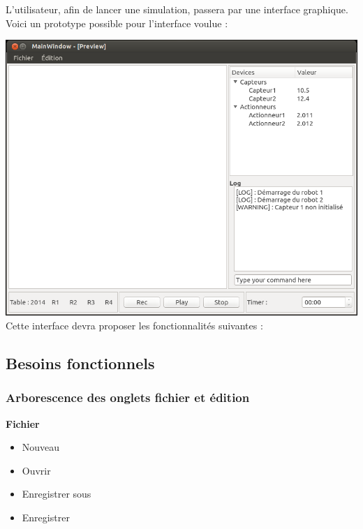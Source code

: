 L'utilisateur, afin de lancer une simulation, passera par une interface graphique. Voici un prototype possible pour l'interface voulue :



\vspace{5 mm}
\includegraphics[scale=0.5]{GUI.png}
\vspace{5 mm}
\\

Cette interface devra proposer les fonctionnalités suivantes : 

\subsection{Besoins fonctionnels}

\subsubsection{Arborescence des onglets fichier et édition}
\textbf{Fichier}
\begin{itemize}
\item Nouveau
\item Ouvrir
\item Enregistrer sous
\item Enregistrer
\end{itemize}


